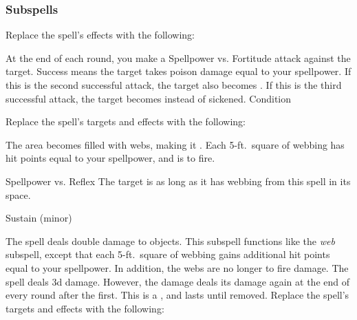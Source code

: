 \subsubsection{Subspells}
Replace the spell's effects with the following:
\begin{spellcontent}
\begin{augmenteffects}
\spelleffect
At the end of each round, you make a Spellpower vs. Fortitude attack against the target.
Success means the target takes poison damage equal to your spellpower.
If this is the second successful attack, the target also becomes .
If this is the third successful attack, the target becomes  instead of sickened.
\spelldur Condition
\end{augmenteffects}
\end{spellcontent}
Replace the spell's targets and effects with the following:
\begin{spellcontent}
\begin{augmenttargetinginfo}
\end{augmenttargetinginfo}
\begin{augmenteffects}
\spelleffect
The area becomes filled with webs, making it .
Each 5-ft.\ square of webbing has hit points equal to your spellpower, and is  to fire.
\begin{spellattack}{Spellpower vs. Reflex}
\spellsuccess The target is \immobilized as long as it has webbing from this spell in its space.
\end{spellattack}
\spelldur Sustain (minor)
\end{augmenteffects}
\end{spellcontent}
The spell deals double damage to objects.
This subspell functions like the \textit{web} subspell, except that each 5-ft.\ square of webbing gains additional hit points equal to your spellpower.
In addition, the webs are no longer  to fire damage.
The spell deals \minus3d damage.
However, the damage deals its damage again at the end of every round after the first.
This is a , and lasts until removed.
Replace the spell's targets and effects with the following:
